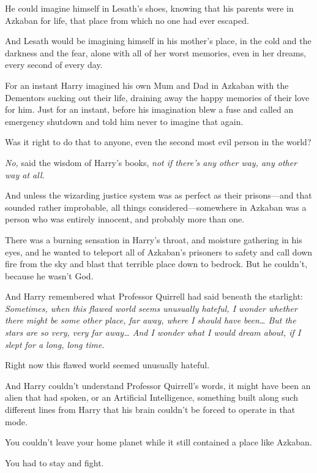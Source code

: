 He could imagine himself in Lesath's shoes, knowing that his parents
were in Azkaban for life, that place from which no one had ever escaped.

And Lesath would be imagining himself in his mother's place, in the cold
and the darkness and the fear, alone with all of her worst memories,
even in her dreams, every second of every day.

For an instant Harry imagined his own Mum and Dad in Azkaban with the
Dementors sucking out their life, draining away the happy memories of
their love for him. Just for an instant, before his imagination blew a
fuse and called an emergency shutdown and told him never to imagine that
again.

Was it right to do that to anyone, even the second most evil person in
the world?

\emph{No,} said the wisdom of Harry's books, \emph{not if there's any
other way, any other way at all.}

And unless the wizarding justice system was as perfect as their
prisons---and that sounded rather improbable, all things
considered---somewhere in Azkaban was a person who was entirely
innocent, and probably more than one.

There was a burning sensation in Harry's throat, and moisture gathering
in his eyes, and he wanted to teleport all of Azkaban's prisoners to
safety and call down fire from the sky and blast that terrible place
down to bedrock. But he couldn't, because he wasn't God.

And Harry remembered what Professor Quirrell had said beneath the
starlight: \emph{Sometimes, when this flawed world seems unusually
hateful, I wonder whether there might be some other place, far away,
where I should have been\ldots{} But the stars are so very, very far
away\ldots{} And I wonder what I would dream about, if I slept for a
long, long time.}

Right now this flawed world seemed unusually hateful.

And Harry couldn't understand Professor Quirrell's words, it might have
been an alien that had spoken, or an Artificial Intelligence, something
built along such different lines from Harry that his brain couldn't be
forced to operate in that mode.

You couldn't leave your home planet while it still contained a place
like Azkaban.

You had to stay and fight.
